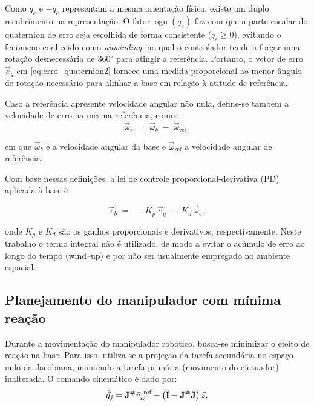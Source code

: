 Como $q_e$ e $-q_e$ representam a mesma orientação física, existe um duplo recobrimento na representação.
O fator $\operatorname{sgn}(q_{e})$ faz com que a parte escalar do quaternion de erro seja escolhida de forma consistente ($q_{e}\ge 0$), evitando o fenômeno conhecido como \emph{unwinding}, no qual o controlador tende a forçar uma rotação desnecessária de $360^{\circ}$ para atingir a referência.
Portanto, o vetor de erro $\vec e_q$ em \eqref{eq:erro_quaternion2} fornece uma medida proporcional ao menor ângulo de rotação necessário para alinhar a base em relação à atitude de referência.


Caso a referência apresente velocidade angular não nula, define-se também a velocidade de erro na mesma referência, como:
\begin{equation}
    \vec{\omega}_e \;=\; \vec{\omega}_b \;-\; \vec{\omega}_{\mathrm{ref}},
    \label{eq:erro_velocidade}
\end{equation}

em que $\vec{\omega}_b$ é a velocidade angular da base e $\vec{\omega}_{\mathrm{ref}}$ a velocidade angular de referência.

Com base nessas definições, a lei de controle proporcional-derivativa (PD) aplicada à base é

\begin{equation}
    \vec{\tau}_b \;=\; -\,K_p\,\vec e_q \;-\; K_d\,\vec\omega_e,
    \label{eq:lei_controle_PD}
\end{equation}

onde $K_p$ e $K_d$ são os ganhos proporcionais e derivativos, respectivamente. 
Neste trabalho o termo integral não é utilizado, de modo a evitar o acúmulo de erro ao longo do tempo (wind--up) 
e por não ser usualmente empregado no ambiente espacial.


\subsection{Planejamento do manipulador com mínima reação}
Durante a movimentação do manipulador robótico, busca-se minimizar o efeito de reação na base. Para isso, utiliza-se a projeção da tarefa secundária no espaço nulo da Jacobiana, mantendo a tarefa primária (movimento do efetuador) inalterada. O comando cinemático é dado por:
\begin{equation}
    \dot{\vec{q}}_j = \mathbf{J}^\# \vec{v}_E^{\text{\, ref}} + \left( \mathbf{I} - \mathbf{J}^\# \mathbf{J} \right) \vec{z},
\end{equation}

